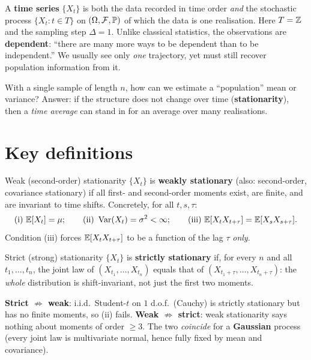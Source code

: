 \documentclass[11pt]{article}
\begin{document}

A \textbf{time series} $\{X_t\}$ is both the data recorded in time order \emph{and} the stochastic process $\{X_t:t\in T\}$ on $(\Omega,\mathcal F,\mathbb{P})$ of which the data is one realisation. Here $T=\mathbb{Z}$ and the sampling step $\Delta=1$. Unlike classical statistics, the observations are \textbf{dependent}: ``there are many more ways to be dependent than to be independent.'' We usually see only \emph{one} trajectory, yet must still recover population information from it.

\begin{intu}
With a single sample of length $n$, how can we estimate a ``population'' mean or variance? Answer: if the structure does not change over time (\textbf{stationarity}), then a \emph{time average} can stand in for an average over many realisations.
\end{intu}

\section*{Key definitions}

\begin{defn}{Weak (second-order) stationarity}
$\{X_t\}$ is \textbf{weakly stationary} (also: second-order, covariance stationary) if all first- and second-order moments exist, are finite, and are invariant to time shifts. Concretely, for all $t,s,\tau$:
\[
\text{(i) } \mathbb{E}[X_t]=\mu;\qquad
\text{(ii) } \operatorname{Var}(X_t)=\sigma^2<\infty;\qquad
\text{(iii) } \mathbb{E}[X_tX_{t+\tau}]=\mathbb{E}[X_sX_{s+\tau}].
\]
Condition (iii) forces $\mathbb{E}[X_tX_{t+\tau}]$ to be a function of the lag $\tau$ \emph{only}.
\end{defn}

\begin{defn}{Strict (strong) stationarity}
$\{X_t\}$ is \textbf{strictly stationary} if, for every $n$ and all $t_1,\dots,t_n$, the joint law of $(X_{t_1},\dots,X_{t_n})$ equals that of $(X_{t_1+\tau},\dots,X_{t_n+\tau})$: the \emph{whole} distribution is shift-invariant, not just the first two moments.
\end{defn}

\begin{intu}
\textbf{Strict $\not\Rightarrow$ weak}: i.i.d.\ Student-$t$ on $1$ d.o.f.\ (Cauchy) is strictly stationary but has no finite moments, so (ii) fails. \textbf{Weak $\not\Rightarrow$ strict}: weak stationarity says nothing about moments of order $\ge 3$. The two \emph{coincide} for a \textbf{Gaussian} process (every joint law is multivariate normal, hence fully fixed by mean and covariance).
\end{intu}
\end{document}
